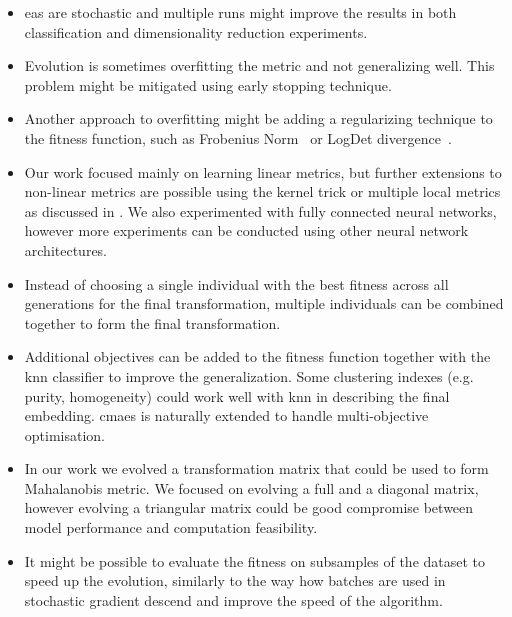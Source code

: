 \documentclass[12pt,a4paper]{report}
\begin{document}
\begin{itemize}
\item \Aclp{ea} are stochastic and multiple runs might improve the results in both classification and dimensionality reduction experiments.

\item Evolution is sometimes overfitting the metric and not generalizing well. This problem might be mitigated using early stopping technique.

\item Another approach to overfitting might be adding a regularizing technique to the fitness function, such as Frobenius Norm~\citep{schultz2003learning} or LogDet divergence~\citep{davis2007information}.

\item Our work focused mainly on learning linear metrics, but further extensions to non-linear metrics are possible using the kernel trick \citep{chatpatanasiri2010new} or multiple local metrics as discussed in \cite{bellet2013survey}. We also experimented with fully connected neural networks, however more experiments can be conducted using other neural network architectures.

\item Instead of choosing a single individual with the best fitness across all generations for the final transformation, multiple individuals can be combined together to form the final transformation.

\item Additional objectives can be added to the fitness function together with the \ac{knn} classifier to improve the generalization.  Some clustering indexes (e.g. purity, homogeneity) could work well with \ac{knn} in describing the final embedding. \ac{cmaes} is naturally extended to handle multi-objective optimisation.

\item In our work we evolved a transformation matrix that could be used to form Mahalanobis metric. We focused on evolving a full and a diagonal matrix, however evolving a triangular matrix could be good compromise between model performance and computation feasibility.

\item It might be possible to evaluate the fitness on subsamples of the dataset to speed up the evolution, similarly to the way how batches are used in stochastic gradient descend and improve the speed of the algorithm.
\end{itemize}
\end{document}
